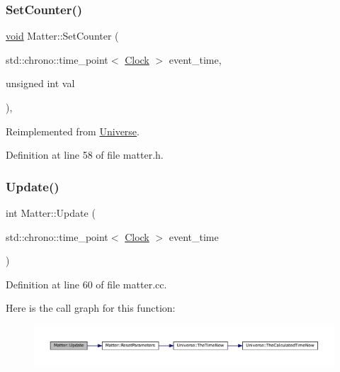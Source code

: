 \subsubsection{\texorpdfstring{Set\+Counter()}{SetCounter()}}
{\footnotesize\ttfamily \mbox{\hyperlink{glad_8h_a950fc91edb4504f62f1c577bf4727c29}{void}} Matter\+::\+Set\+Counter (\begin{DoxyParamCaption}\item[{std\+::chrono\+::time\+\_\+point$<$ \mbox{\hyperlink{universe_8h_a0ef8d951d1ca5ab3cfaf7ab4c7a6fd80}{Clock}} $>$}]{event\+\_\+time,  }\item[{unsigned int}]{val }\end{DoxyParamCaption})\hspace{0.3cm}{\ttfamily [inline]}, {\ttfamily [virtual]}}



Reimplemented from \mbox{\hyperlink{class_universe_aa22202ae740eb1355529afcb13285e91}{Universe}}.



Definition at line 58 of file matter.\+h.

\mbox{\label{class_matter_a56898dd51e5a675832bc82de285b3ef7}} 
\subsubsection{\texorpdfstring{Update()}{Update()}}
{\footnotesize\ttfamily int Matter\+::\+Update (\begin{DoxyParamCaption}\item[{std\+::chrono\+::time\+\_\+point$<$ \mbox{\hyperlink{universe_8h_a0ef8d951d1ca5ab3cfaf7ab4c7a6fd80}{Clock}} $>$}]{event\+\_\+time }\end{DoxyParamCaption})}



Definition at line 60 of file matter.\+cc.

Here is the call graph for this function\+:\nopagebreak
\begin{figure}[H]
\begin{center}
\leavevmode
\includegraphics[width=350pt]{class_matter_a56898dd51e5a675832bc82de285b3ef7_cgraph}
\end{center}
\end{figure}


